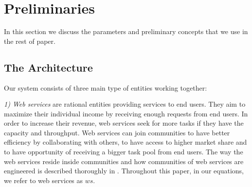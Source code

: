 \documentclass[10pt, conference, compsocconf]{IEEEtran}
\theoremstyle{plain}
\theoremstyle{definition}
\begin{document}
%
%

\section{Preliminaries}\label{s:preliminaries}

In this section we discuss the parameters and preliminary concepts that we use in the rest of paper. 

\subsection{The Architecture}

Our system consists of three main type of entities working together:

\emph{1) Web services} are rational entities providing services to end users. They aim to maximize their individual income by receiving enough requests from end users. In order to increase their revenue, web services seek for more tasks if they have the capacity and throughput. Web services can join communities to have better efficiency by collaborating with others, to have access to higher market share and to have opportunity of receiving a bigger task pool from end users. The way the web services reside inside communities and how communities of web services are engineered is described thoroughly in \cite{DBLP:journals/ijebr/MaamarSTBB09}. Throughout this paper, in our equations, we refer to web services as $ws$.
\end{document}
